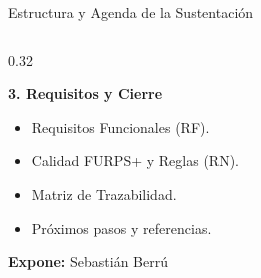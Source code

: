 \documentclass[aspectratio=169, 10pt]{beamer}
\begin{document}
\begin{frame}{Estructura y Agenda de la Sustentación}
\begin{columns}[t]
        \begin{column}{0.32\textwidth}
            \begin{block}{\textbf{3. Requisitos y Cierre}}
                \footnotesize
                \begin{itemize}
                    \item Requisitos Funcionales (RF).
                    \item Calidad FURPS+ y Reglas (RN).
                    \item Matriz de Trazabilidad.
                    \item Próximos pasos y referencias.
                \end{itemize}
                \vspace{0.15cm}
                \scriptsize \textbf{Expone:} Sebastián Berrú
            \end{block}
        \end{column}
    \end{columns}
\end{frame}

\end{document}
